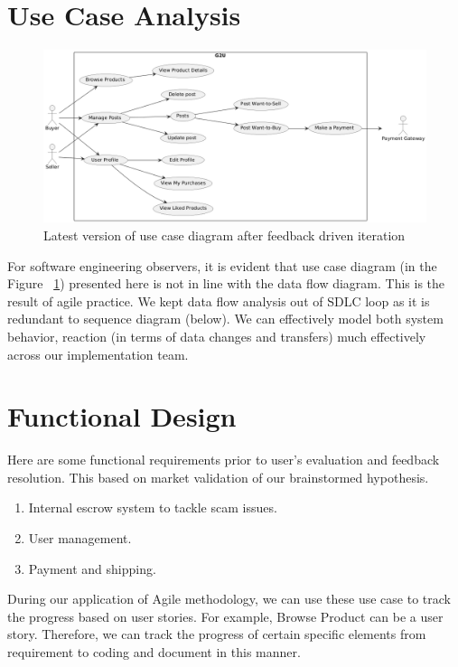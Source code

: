 \section{Use Case Analysis}

\begin{figure}[!h]
	\centering
	\includegraphics[width=1\textwidth]{chapters/ch-03/00_usecase.png} %
	\caption{Latest version of use case diagram after feedback driven iteration}
	\label{fig:usecase} %
\end{figure}

For software engineering observers, it is evident that use case diagram (in the Figure ~\ref{fig:usecase}) presented here is not in line with the data flow diagram. This is the result of agile practice. We kept data flow analysis out of SDLC loop as it is redundant to sequence diagram (below). We can effectively model both system behavior, reaction (in terms of data changes and transfers) much effectively across our implementation team.

\section{Functional Design}

Here are some functional requirements prior to user's evaluation and feedback resolution. This based on market validation of our brainstormed hypothesis.

\begin{enumerate}
	\item Internal escrow system to tackle scam issues.
	\item User management.
	\item Payment and shipping.
\end{enumerate}

During our application of Agile methodology, we can use these use case to track the progress based on user stories. For example, Browse Product can be a user story. Therefore, we can track the progress of certain specific elements from requirement to coding and document in this manner.

